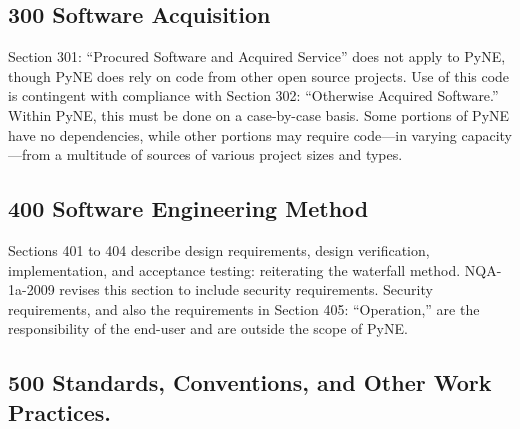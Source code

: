 \documentclass{anstrans}
\begin{document}

\subsection{300 Software Acquisition}

Section 301: ``Procured Software and Acquired Service'' does not apply to PyNE,
though PyNE does rely on code from other open source projects. Use of this code
is contingent with compliance with Section 302: ``Otherwise Acquired Software.''
Within PyNE, this must be done on a case-by-case basis. Some portions of PyNE
have no dependencies, while other portions may require code---in varying capacity---from a multitude of
sources of various project sizes and types.



\subsection{400 Software Engineering Method}

Sections 401 to 404 describe design requirements, design
verification, implementation, and acceptance testing: reiterating the
waterfall method. NQA-1a-2009 revises this section to include security
requirements. Security requirements, and also the requirements in Section 405:
``Operation,'' are the responsibility of the end-user and are outside the scope of
PyNE.


\subsection{500 Standards, Conventions, and Other Work Practices.}
\end{document}
